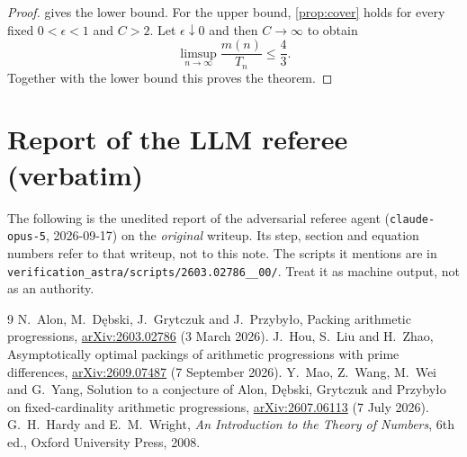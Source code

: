 \documentclass[11pt,a4paper]{article}
\theoremstyle{plain}
\theoremstyle{definition}
\theoremstyle{remark}
\begin{document}
\label{pf:main}
\thmmain*
\begin{proof}
 gives the lower bound. For the upper bound, \cref{prop:cover} holds for every fixed $0<\epsilon<1$ and $C>2$. Let $\epsilon\downarrow0$ and then $C\to\infty$ to obtain
\[
 \limsup_{n\to\infty}\frac{m(n)}{T_n}\le\frac43.
\]
Together with the lower bound this proves the theorem.
\end{proof}

\section{Report of the LLM referee (verbatim)}\label{app:referee}

\begin{tcolorbox}[colback=gray!8,colframe=gray!50,boxrule=0.4pt,arc=2pt]
\small The following is the unedited report of the adversarial referee agent (\texttt{claude-opus-5}, 2026-09-17) on the \emph{original} writeup. Its step, section and equation numbers refer to that writeup, not to this note. The scripts it mentions are in \texttt{verification\_astra/scripts/2603.02786\_\_00/}. Treat it as machine output, not as an authority.
\end{tcolorbox}



\begin{thebibliography}{9}
\small
\setlength{\itemsep}{2pt}
 N.~Alon, M.~D\k{e}bski, J.~Grytczuk and J.~Przyby\l{}o, Packing arithmetic progressions, \href{https://arxiv.org/abs/2603.02786}{arXiv:2603.02786} (3 March 2026).
 J.~Hou, S.~Liu and H.~Zhao, Asymptotically optimal packings of arithmetic progressions with prime differences, \href{https://arxiv.org/abs/2609.07487}{arXiv:2609.07487} (7 September 2026).
 Y.~Mao, Z.~Wang, M.~Wei and G.~Yang, Solution to a conjecture of Alon, D\k{e}bski, Grytczuk and Przyby\l{}o on fixed-cardinality arithmetic progressions, \href{https://arxiv.org/abs/2607.06113}{arXiv:2607.06113} (7 July 2026).
 G.~H.~Hardy and E.~M.~Wright, \emph{An Introduction to the Theory of Numbers}, 6th ed., Oxford University Press, 2008.
\end{thebibliography}
\end{document}

